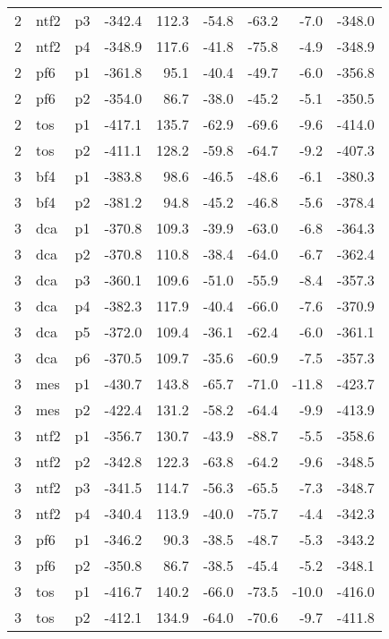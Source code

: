 \documentclass[a4paper]{article}
\begin{document}
\begin{table}[ht]
\begin{tabular}{rllrrrrrr}
   2 & ntf2 & p3 & -342.4 & 112.3 & -54.8 & -63.2 & -7.0 & -348.0 \\ 
   2 & ntf2 & p4 & -348.9 & 117.6 & -41.8 & -75.8 & -4.9 & -348.9 \\ 
   2 & pf6 & p1 & -361.8 & 95.1 & -40.4 & -49.7 & -6.0 & -356.8 \\ 
   2 & pf6 & p2 & -354.0 & 86.7 & -38.0 & -45.2 & -5.1 & -350.5 \\ 
   2 & tos & p1 & -417.1 & 135.7 & -62.9 & -69.6 & -9.6 & -414.0 \\ 
   2 & tos & p2 & -411.1 & 128.2 & -59.8 & -64.7 & -9.2 & -407.3 \\ 
   3 & bf4 & p1 & -383.8 & 98.6 & -46.5 & -48.6 & -6.1 & -380.3 \\ 
   3 & bf4 & p2 & -381.2 & 94.8 & -45.2 & -46.8 & -5.6 & -378.4 \\ 
   3 & dca & p1 & -370.8 & 109.3 & -39.9 & -63.0 & -6.8 & -364.3 \\ 
   3 & dca & p2 & -370.8 & 110.8 & -38.4 & -64.0 & -6.7 & -362.4 \\ 
   3 & dca & p3 & -360.1 & 109.6 & -51.0 & -55.9 & -8.4 & -357.3 \\ 
   3 & dca & p4 & -382.3 & 117.9 & -40.4 & -66.0 & -7.6 & -370.9 \\ 
   3 & dca & p5 & -372.0 & 109.4 & -36.1 & -62.4 & -6.0 & -361.1 \\ 
   3 & dca & p6 & -370.5 & 109.7 & -35.6 & -60.9 & -7.5 & -357.3 \\ 
   3 & mes & p1 & -430.7 & 143.8 & -65.7 & -71.0 & -11.8 & -423.7 \\ 
   3 & mes & p2 & -422.4 & 131.2 & -58.2 & -64.4 & -9.9 & -413.9 \\ 
   3 & ntf2 & p1 & -356.7 & 130.7 & -43.9 & -88.7 & -5.5 & -358.6 \\ 
   3 & ntf2 & p2 & -342.8 & 122.3 & -63.8 & -64.2 & -9.6 & -348.5 \\ 
   3 & ntf2 & p3 & -341.5 & 114.7 & -56.3 & -65.5 & -7.3 & -348.7 \\ 
   3 & ntf2 & p4 & -340.4 & 113.9 & -40.0 & -75.7 & -4.4 & -342.3 \\ 
   3 & pf6 & p1 & -346.2 & 90.3 & -38.5 & -48.7 & -5.3 & -343.2 \\ 
   3 & pf6 & p2 & -350.8 & 86.7 & -38.5 & -45.4 & -5.2 & -348.1 \\ 
   3 & tos & p1 & -416.7 & 140.2 & -66.0 & -73.5 & -10.0 & -416.0 \\ 
   3 & tos & p2 & -412.1 & 134.9 & -64.0 & -70.6 & -9.7 & -411.8 \\ 

\end{tabular}
\end{table}
\end{document}
